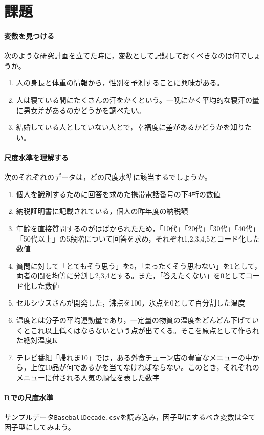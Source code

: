 \documentclass{ltjsbook}
\begin{document}
\section{課題}
\paragraph{変数を見つける}次のような研究計画を立てた時に，変数として記録しておくべきなのは何でしょうか。
\begin{enumerate}
	\item 人の身長と体重の情報から，性別を予測することに興味がある。
	\item 人は寝ている間にたくさんの汗をかくという。一晩にかく平均的な寝汗の量に男女差があるのかどうかを調べたい。
	\item 結婚している人としていない人とで，幸福度に差があるかどうかを知りたい。
\end{enumerate}

\paragraph{尺度水準を理解する}次のそれぞれのデータは，どの尺度水準に該当するでしょうか。
\begin{enumerate}
	\item 個人を識別するために回答を求めた携帯電話番号の下4桁の数値
	\item 納税証明書に記載されている，個人の昨年度の納税額
	\item 年齢を直接質問するのがはばかられたため，「10代」「20代」「30代」「40代」「50代以上」の5段階について回答を求め，それぞれ1,2,3,4,5とコード化した数値
	\item 質問に対して「とてもそう思う」を5，「まったくそう思わない」を1として，両者の間を均等に分割し2,3,4とする。また，「答えたくない」を0としてコード化した数値
	\item セルシウスさんが開発した，沸点を100，氷点を0として百分割した温度
	\item 温度とは分子の平均運動量であり，一定量の物質の温度をどんどん下げていくとこれ以上低くはならないという点が出てくる。そこを原点として作られた絶対温度K
	\item テレビ番組「帰れま10」では，ある外食チェーン店の豊富なメニューの中から，上位10品が何であるかを当てなければならない。このとき，それぞれのメニューに付される人気の順位を表した数字
\end{enumerate}

\paragraph{Rでの尺度水準}サンプルデータ\verb|BaseballDecade.csv|を読み込み，因子型にするべき変数は全て因子型にしてみよう。
\end{document}
